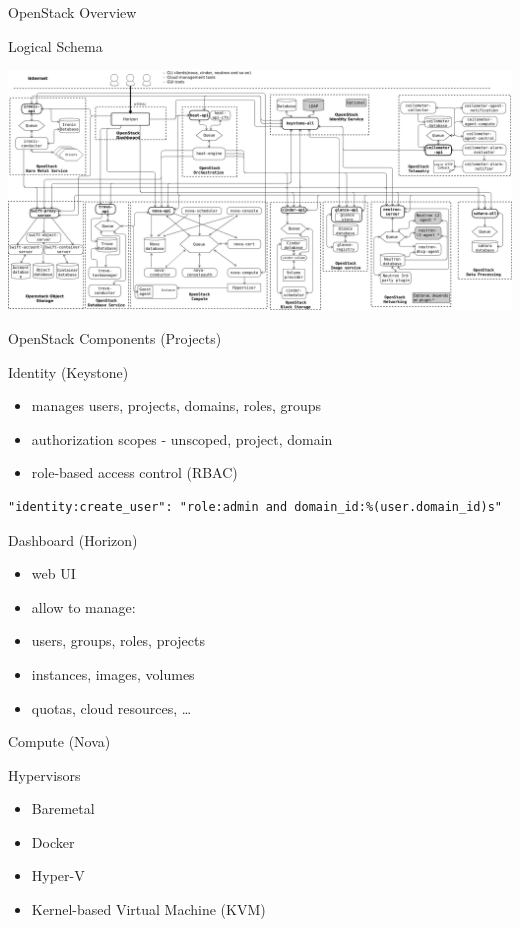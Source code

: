 \documentclass[presentation]{beamer}
\begin{document}
\begin{frame}[label={sec:org7580345}]{OpenStack Overview}
\begin{block}{Logical Schema}
\begin{center}
\includegraphics[width=.9\linewidth]{./openstack-logical-arch-kilo.png}
\end{center}
\end{block}
\end{frame}
\begin{frame}[fragile,label={sec:orgdf62090}]{OpenStack Components (Projects)}
 \begin{block}{Identity (Keystone)}
\begin{itemize}
\item manages users, projects, domains, roles, groups
\item authorization scopes - unscoped, project, domain
\item role-based access control (RBAC)
\end{itemize}
\begin{verbatim}
"identity:create_user": "role:admin and domain_id:%(user.domain_id)s"
\end{verbatim}
\end{block}
\begin{block}{Dashboard (Horizon)}
\begin{itemize}
\item web UI
\item allow to manage:
\item users, groups, roles, projects
\item instances, images, volumes
\item quotas, cloud resources, \ldots{}
\end{itemize}
\end{block}
\begin{block}{Compute (Nova)}
\begin{block}{Hypervisors}
\begin{itemize}
\item Baremetal
\item Docker
\item Hyper-V
\item Kernel-based Virtual Machine (KVM)

\end{itemize}
\end{block}
\end{block}
\end{frame}
\end{document}
